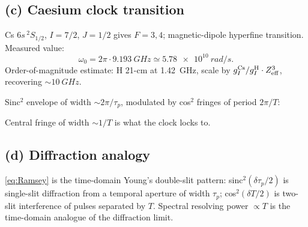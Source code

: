 \documentclass[11pt]{article}
\begin{document}
\subsection*{(c) Caesium clock transition}

Cs $6s\,^2S_{1/2}$, $I=7/2$, $J=1/2$ gives $F=3,4$; magnetic-dipole hyperfine transition. Measured value:
\begin{equation}
\boxed{\;\omega_0=2\pi\cdot\SI{9.193}{GHz}\simeq\SI{5.78e10}{rad/s}.\;}
\label{eq:omega-cs}
\end{equation}
Order-of-magnitude estimate: H 21-cm at \SI{1.42}{GHz}, scale by $g_I^{\rm Cs}/g_I^{\rm H}\cdot Z_{\rm eff}^3$, recovering $\sim\SI{10}{GHz}$.

Sinc$^2$ envelope of width $\sim 2\pi/\tau_p$, modulated by cos$^2$ fringes of period $2\pi/T$:

\begin{center}
\end{center}

Central fringe of width $\sim 1/T$ is what the clock locks to.

\subsection*{(d) Diffraction analogy}

\eqref{eq:Ramsey} is the time-domain Young's double-slit pattern: sinc$^2(\delta\tau_p/2)$ is single-slit diffraction from a temporal aperture of width $\tau_p$; cos$^2(\delta T/2)$ is two-slit interference of pulses separated by $T$. Spectral resolving power $\propto T$ is the time-domain analogue of the diffraction limit.
\end{document}
